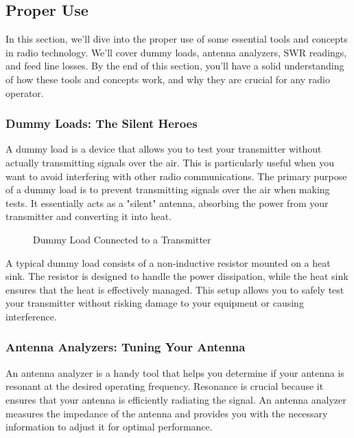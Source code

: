 \subsection{Proper Use}
\label{subsec:proper-use}

In this section, we'll dive into the proper use of some essential tools and concepts in radio technology. We'll cover dummy loads, antenna analyzers, SWR readings, and feed line losses. By the end of this section, you'll have a solid understanding of how these tools and concepts work, and why they are crucial for any radio operator.

\subsubsection*{Dummy Loads: The Silent Heroes}

A dummy load is a device that allows you to test your transmitter without actually transmitting signals over the air. This is particularly useful when you want to avoid interfering with other radio communications. The primary purpose of a dummy load is to prevent transmitting signals over the air when making tests. It essentially acts as a "silent" antenna, absorbing the power from your transmitter and converting it into heat.

\begin{figure}[h]
    \centering
    \caption{Dummy Load Connected to a Transmitter}
    \label{fig:dummy-load}
\end{figure}

A typical dummy load consists of a non-inductive resistor mounted on a heat sink. The resistor is designed to handle the power dissipation, while the heat sink ensures that the heat is effectively managed. This setup allows you to safely test your transmitter without risking damage to your equipment or causing interference.

\subsubsection*{Antenna Analyzers: Tuning Your Antenna}

An antenna analyzer is a handy tool that helps you determine if your antenna is resonant at the desired operating frequency. Resonance is crucial because it ensures that your antenna is efficiently radiating the signal. An antenna analyzer measures the impedance of the antenna and provides you with the necessary information to adjust it for optimal performance.

